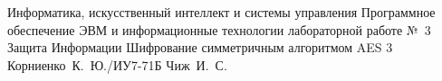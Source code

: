 \documentclass{bmstu}
\begin{document}
\makereporttitle
    {Информатика, искусственный интеллект и системы управления} %
    {Программное обеспечение ЭВМ и информационные технологии} %
    {лабораторной работе №~3} %
    {Защита Информации} %
    {Шифрование симметричным алгоритмом AES} %
    {3} %
    {Корниенко~К.~Ю./ИУ7-71Б} %
    {Чиж~И.~С.} %

\maketableofcontents






\makebibliography
\end{document}
